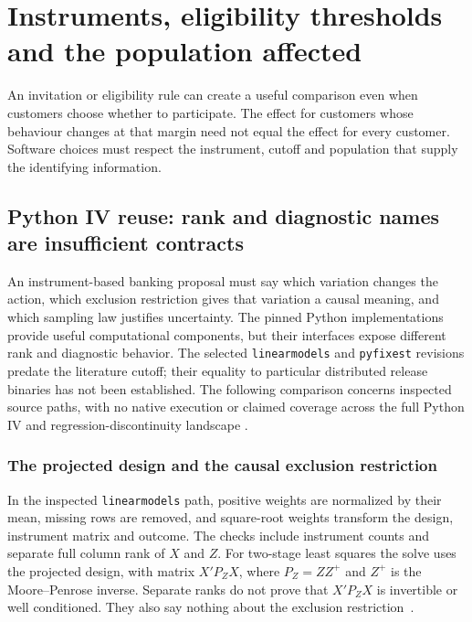 \chapter{Instruments, eligibility thresholds and the population affected}
An invitation or eligibility rule can create a useful comparison even
when customers choose whether to participate. The effect for customers whose
behaviour changes at that margin need not equal the effect for every customer.
Software choices must respect the instrument, cutoff and population that
supply the identifying information.



\section{Python IV reuse: rank and diagnostic names are insufficient contracts}
\label{exec22:pyiv-scope}

An instrument-based banking proposal must say which variation changes the
action, which exclusion restriction gives that variation a causal meaning,
and which sampling law justifies uncertainty. The pinned Python implementations
provide useful computational components, but their interfaces expose different
rank and diagnostic behavior. The selected \texttt{linearmodels} and
\texttt{pyfixest} revisions predate the literature cutoff; their equality to
particular distributed release binaries has not been established. The following
comparison concerns inspected source paths, with no native execution or claimed
coverage across the full Python IV and regression-discontinuity landscape
\citep{exec22_pyiv_kernels_linearmodels,exec22_pyiv_kernels_pyfixest}.

\subsection{The projected design and the causal exclusion restriction}
\label{exec22:pyiv-rank}

In the inspected \texttt{linearmodels} path, positive weights are normalized by
their mean, missing rows are removed, and square-root weights transform the
design, instrument matrix and outcome. The checks include instrument counts
and separate full column rank of $X$ and $Z$. For two-stage least squares the
solve uses the projected design, with matrix $X'P_ZX$, where
$P_Z=ZZ^+$ and $Z^+$ is the Moore--Penrose inverse. Separate ranks do not prove
that $X'P_ZX$ is invertible or well conditioned. They also say nothing about the
exclusion restriction~\citep{exec22_pyiv_kernels_linearmodels}.

